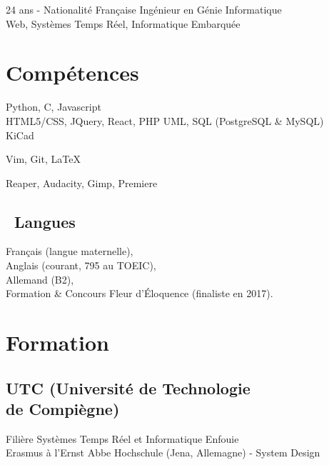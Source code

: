 \documentclass[]{cv-template}
\begin{document}
%
%
{24 ans - Nationalité Française}
{Ingénieur en Génie Informatique \\Web, Systèmes Temps Réel, Informatique Embarquée}
{}

%
%
\begin{minipage}[t]{0.34\textwidth}

\section{Compétences}
Python, C, Javascript\\

HTML5/CSS, JQuery, React, PHP
UML, SQL (PostgreSQL \& MySQL)\\

KiCad

Vim, Git, \LaTeX

Reaper, Audacity, Gimp, Premiere

\sectionsep
\subsection{\ Langues}
Français (langue maternelle), \\
Anglais (courant, 795 au TOEIC), \\
Allemand (B2),\\

Formation \& Concours Fleur d'Éloquence (finaliste en 2017).
\sectionsep

\section{Formation}

\subsection[UTC (Université de Technologie de Compiègne)]{UTC (Université de Technologie\\ de Compiègne)}
Filière Systèmes Temps Réel et Informatique Enfouie\\
Erasmus à l'Ernst Abbe Hochschule (Jena, Allemagne) - System Design\\
\sectionsep


\end{minipage}
\end{document}
